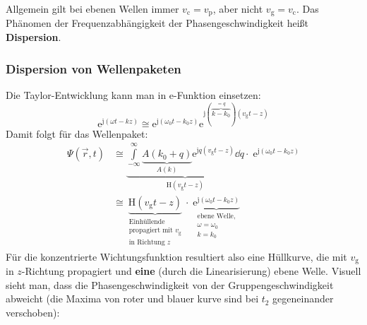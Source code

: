 		        \begin{center}
			        
		        \end{center}
		        Allgemein gilt bei ebenen Wellen immer $v_{\mathrm{c}}=v_{\mathrm{p}}$, aber nicht $v_{\mathrm{g}}=v_{\mathrm{c}}$. Das Phänomen der Frequenzabhängigkeit der Phasengeschwindigkeit heißt \textbf{Dispersion}. 
  \subsubsection{Dispersion von Wellenpaketen}
	  Die Taylor-Entwicklung kann man in e-Funktion einsetzen:
		        \begin{equation}
			        \mathrm{e}^{\mathrm{j}(\omega t -  k z)} \cong  \mathrm{e}^{\mathrm{j}(\omega_0 t -  k_0 z)}  \mathrm{e}^{\mathrm{j}(\overbrace{ k -  k_0}^{=q})( v_{\mathrm{g}} t - z)}
		        \end{equation}
		Damit folgt für das Wellenpaket:
		        \begin{equation}\begin{split}
				        \Psi (\vec{r} , t) &\cong \underbrace{\int\limits_{-\infty}^{\infty} \underbrace{A( k_0 + q)}_{A( k)} \mathrm{e}^{\mathrm{j}q ( v_{\mathrm{g}} t - z)}\dd q}_{\mathrm{H}( v_{\mathrm{g}} t -z)} \cdot\;  \mathrm{e}^{\mathrm{j}( \omega_0 t -  k_0 z)}\\
				        & \cong \underbrace{\mathrm{H}( v_{\mathrm{g}} t -z)}_{\substack{\text{Einhüllende}\\ \text{propagiert mit } v_{\mathrm{g}}\\ \text{in Richtung $z$}}}\cdot\; \underbrace{ \mathrm{e}^{\mathrm{j}(\omega_0 t -  k_0 z)}}_{\substack{\text{ebene Welle,}\\ \omega = \omega_0\\  k =  k_0}}
			        \end{split}\end{equation}
		        Für die konzentrierte Wichtungsfunktion resultiert also eine Hüllkurve, die mit $v_{\mathrm{g}}$ in $z$-Richtung propagiert und \textbf{eine} (durch die Linearisierung) ebene Welle. Visuell sieht man, dass die Phasengeschwindigkeit von der Gruppengeschwindigkeit abweicht (die Maxima von roter und blauer kurve sind bei $t_2$ gegeneinander verschoben):
	  \begin{center}
		  
	  \end{center}
